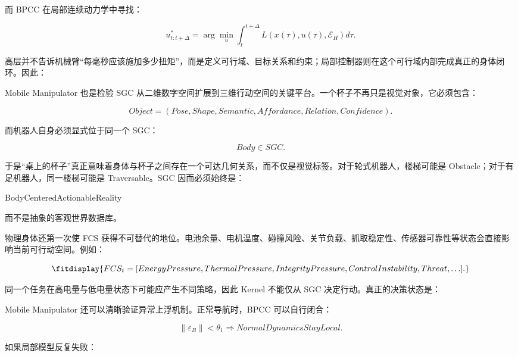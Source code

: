 而 BPCC 在局部连续动力学中寻找：

$$
u_{t:t+\Delta}^{*}
=
\arg\min_{u}
\int_t^{t+\Delta}
L(x(\tau),u(\tau),\mathcal E_H)d\tau.
$$

高层并不告诉机械臂“每毫秒应该施加多少扭矩”，而是定义可行域、目标关系和约束；局部控制器则在这个可行域内部完成真正的身体闭环。因此：

\begin{statementbox}
\centering
{}
\end{statementbox}

Mobile Manipulator 也是检验 SGC 从二维数字空间扩展到三维行动空间的关键平台。一个杯子不再只是视觉对象，它必须包含：

$$
Object=
(
Pose,
Shape,
Semantic,
Affordance,
Relation,
Confidence
).
$$

而机器人自身必须显式位于同一个 SGC：

$$
Body\in SGC.
$$

于是“桌上的杯子”真正意味着身体与杯子之间存在一个可达几何关系，而不仅是视觉标签。对于轮式机器人，楼梯可能是 Obstacle；对于有足机器人，同一楼梯可能是 Traversable。SGC 因而必须始终是：

\begin{statementbox}
BodyCenteredActionableReality
\end{statementbox}

而不是抽象的客观世界数据库。

物理身体还第一次使 FCS 获得不可替代的地位。电池余量、电机温度、碰撞风险、关节负载、抓取稳定性、传感器可靠性等状态会直接影响当前可行动空间。例如：

$$
\fitdisplay{
FCS_t
=
[
EnergyPressure,
ThermalPressure,
IntegrityPressure,
ControlInstability,
Threat,\ldots
].
}
$$

同一个任务在高电量与低电量状态下可能应产生不同策略，因此 Kernel 不能仅从 SGC 决定行动。真正的决策状态是：

\begin{statementbox}
\centering
{}
\end{statementbox}

Mobile Manipulator 还可以清晰验证异常上浮机制。正常导航时，BPCC 可以自行闭合：

$$
\|\varepsilon_B\|<\theta_1
\Rightarrow
NormalDynamicsStayLocal.
$$

如果局部模型反复失败：

